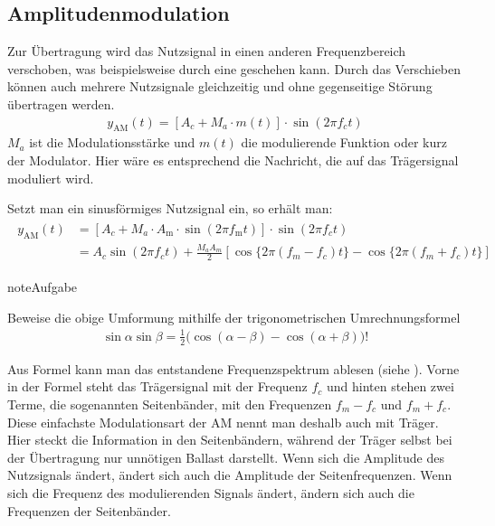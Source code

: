 \documentclass[letterpaper,10pt,english]{jupyterBook}
\begin{document}
\subsection{Amplitudenmodulation}
\label{\detokenize{content/3_Modulationen:amplitudenmodulation}}
\sphinxAtStartPar
Zur Übertragung wird das Nutzsignal in einen anderen Frequenzbereich verschoben, was beispielsweise durch eine  geschehen kann. Durch das Verschieben können auch mehrere Nutzsignale gleichzeitig und ohne gegenseitige Störung übertragen werden.
\begin{equation*}
\begin{split}y_\mathrm{AM}(t) = \left[A_c + M_a \cdot m(t)\right] \cdot \sin(2\pi  f_c  t)\end{split}
\end{equation*}
\sphinxAtStartPar
\(M_a\) ist die Modulationsstärke und \(m(t)\) die modulierende Funktion oder kurz der Modulator. Hier wäre es entsprechend die Nachricht, die auf das Trägersignal moduliert wird.

\sphinxAtStartPar
Setzt man ein sinusförmiges Nutzsignal ein, so erhält man:
\begin{equation*}
\begin{split}
\begin{align} 
y_\mathrm{AM}(t) & = \left[A_c + M_a \cdot A_\mathrm{m} \cdot \sin(2\pi f_\mathrm{m} t)\right] \cdot \sin(2\pi  f_c  t) \\
& = A_c \sin(2\pi  f_c  t)  + \frac{M_a A_m}{2} \left[ \cos\{2\pi(f_m-f_c)t \} - \cos\{2\pi(f_m+f_c)t \} \right]
\end{align} 
\end{split}
\end{equation*}
\begin{sphinxadmonition}{note}{Aufgabe}

\sphinxAtStartPar
Beweise die obige Umformung mithilfe der trigonometrischen Umrechnungsformel
\begin{equation*}
\begin{split}\sin \alpha \sin \beta ={\frac {1}{2}}{\bigl (}\cos(\alpha -\beta )-\cos(\alpha +\beta ){\bigr )} !
\end{split}
\end{equation*}\end{sphinxadmonition}

\sphinxAtStartPar
Aus Formel kann man das entstandene Frequenzspektrum ablesen (siehe {\hyperref[\detokenize{content/3_FourierAnalyse::doc}]{}}). Vorne in der Formel steht das Trägersignal mit der Frequenz \(f_c\) und hinten stehen zwei Terme, die sogenannten Seitenbänder, mit den Frequenzen \(f_m-f_c\) und \(f_m + f_c\). Diese einfachste Modulationsart der AM nennt man deshalb auch  mit Träger. Hier steckt die Information in den Seitenbändern, während der Träger selbst bei der Übertragung nur unnötigen Ballast darstellt. Wenn sich die Amplitude des Nutzsignals ändert, ändert sich auch die Amplitude der Seitenfrequenzen. Wenn sich die Frequenz des modulierenden Signals ändert, ändern sich auch die Frequenzen der Seitenbänder.
\end{document}
